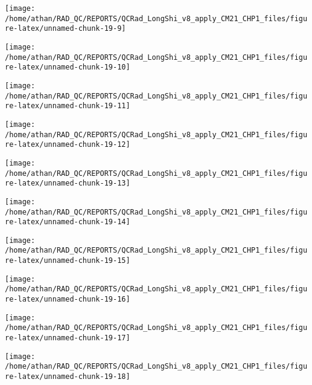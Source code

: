 \documentclass[
  10pt,
  a4paper,oneside]{article}
\begin{document}
\begin{center}\texttt{[image: /home/athan/RAD\_QC/REPORTS/QCRad\_LongShi\_v8\_apply\_CM21\_CHP1\_files/figure-latex/unnamed-chunk-19-9]} \end{center}

\begin{center}\texttt{[image: /home/athan/RAD\_QC/REPORTS/QCRad\_LongShi\_v8\_apply\_CM21\_CHP1\_files/figure-latex/unnamed-chunk-19-10]} \end{center}

\begin{center}\texttt{[image: /home/athan/RAD\_QC/REPORTS/QCRad\_LongShi\_v8\_apply\_CM21\_CHP1\_files/figure-latex/unnamed-chunk-19-11]} \end{center}

\begin{center}\texttt{[image: /home/athan/RAD\_QC/REPORTS/QCRad\_LongShi\_v8\_apply\_CM21\_CHP1\_files/figure-latex/unnamed-chunk-19-12]} \end{center}

\begin{center}\texttt{[image: /home/athan/RAD\_QC/REPORTS/QCRad\_LongShi\_v8\_apply\_CM21\_CHP1\_files/figure-latex/unnamed-chunk-19-13]} \end{center}

\begin{center}\texttt{[image: /home/athan/RAD\_QC/REPORTS/QCRad\_LongShi\_v8\_apply\_CM21\_CHP1\_files/figure-latex/unnamed-chunk-19-14]} \end{center}

\begin{center}\texttt{[image: /home/athan/RAD\_QC/REPORTS/QCRad\_LongShi\_v8\_apply\_CM21\_CHP1\_files/figure-latex/unnamed-chunk-19-15]} \end{center}

\begin{center}\texttt{[image: /home/athan/RAD\_QC/REPORTS/QCRad\_LongShi\_v8\_apply\_CM21\_CHP1\_files/figure-latex/unnamed-chunk-19-16]} \end{center}

\begin{center}\texttt{[image: /home/athan/RAD\_QC/REPORTS/QCRad\_LongShi\_v8\_apply\_CM21\_CHP1\_files/figure-latex/unnamed-chunk-19-17]} \end{center}

\begin{center}\texttt{[image: /home/athan/RAD\_QC/REPORTS/QCRad\_LongShi\_v8\_apply\_CM21\_CHP1\_files/figure-latex/unnamed-chunk-19-18]} \end{center}
\end{document}

